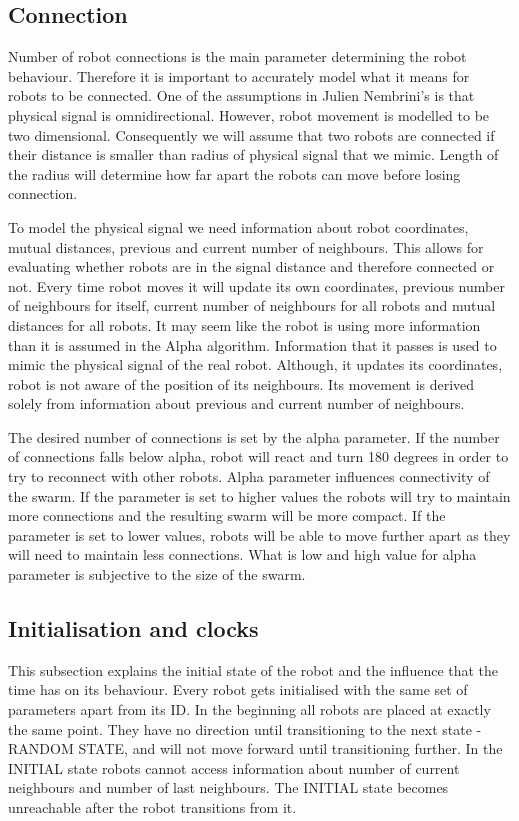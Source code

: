 \subsection{Connection}
Number of robot connections is the main parameter determining the robot behaviour. Therefore it is important to accurately model what it means for robots to be connected. One of the assumptions in Julien Nembrini's \cite{Minimalist_Coherent_Swarming_of_Wireless_Networked_Autonomous_Mobile_Robots} is that physical signal is omnidirectional. However, robot movement is modelled to be two dimensional. Consequently we will assume that two robots are connected if their distance is smaller than radius of physical signal that we mimic. Length of the radius will determine how far apart the robots can move before losing connection.

To model the physical signal we need information about robot coordinates, mutual distances, previous and current number of neighbours. This allows for evaluating whether robots are in the signal distance and therefore connected or not. Every time robot moves it will update its own coordinates, previous number of neighbours for itself, current number of neighbours for all robots and mutual distances for all robots. It may seem like the robot is using more information than it is assumed in the Alpha algorithm. Information that it passes is used to mimic the physical signal of the real robot. Although, it updates its coordinates, robot is not aware of the position of its neighbours. Its movement is derived solely from information about previous and current number of neighbours. 

The desired number of connections is set by the alpha parameter. If the number of connections falls below alpha, robot will react and turn 180 degrees in order to try to reconnect with other robots. Alpha parameter influences connectivity of the swarm. If the parameter is set to higher values the robots will try to maintain more connections and the resulting swarm will be more compact. If the parameter is set to lower values, robots will be able to move further apart as they will need to maintain less connections. What is low and high value for alpha parameter is subjective to the size of the swarm.

\subsection{Initialisation and clocks}
This subsection explains the initial state of the robot and the influence that the time has on its behaviour. Every robot gets initialised with the same set of parameters apart from its ID. In the beginning all robots are placed at exactly the same point. They have no direction until transitioning to the next state - RANDOM STATE, and will not move forward until transitioning further. In the INITIAL state robots cannot access information about number of current neighbours and number of last neighbours. The INITIAL state becomes unreachable after the robot transitions from it.

